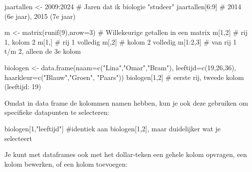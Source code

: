 \documentclass[
  b5paper,
  DIV=11,
  numbers=noendperiod]{scrreprt}
\newenvironment{Shaded}{\begin{snugshade}}{\end{snugshade}}
\newcommand{\AttributeTok}[1]{\textcolor[rgb]{0.40,0.45,0.13}{#1}}
\newcommand{\CommentTok}[1]{\textcolor[rgb]{0.37,0.37,0.37}{#1}}
\newcommand{\DecValTok}[1]{\textcolor[rgb]{0.68,0.00,0.00}{#1}}
\newcommand{\FunctionTok}[1]{\textcolor[rgb]{0.28,0.35,0.67}{#1}}
\newcommand{\NormalTok}[1]{\textcolor[rgb]{0.00,0.23,0.31}{#1}}
\newcommand{\OtherTok}[1]{\textcolor[rgb]{0.00,0.23,0.31}{#1}}
\newcommand{\SpecialCharTok}[1]{\textcolor[rgb]{0.37,0.37,0.37}{#1}}
\newcommand{\StringTok}[1]{\textcolor[rgb]{0.13,0.47,0.30}{#1}}
\theoremstyle{definition}
\theoremstyle{remark}
\begin{document}
\begin{Shaded}
\begin{Highlighting}[]
\NormalTok{jaartallen }\OtherTok{\textless{}{-}} \DecValTok{2009}\SpecialCharTok{:}\DecValTok{2024}         \CommentTok{\# Jaren dat ik biologie "studeer"}
\NormalTok{jaartallen[}\DecValTok{6}\SpecialCharTok{:}\DecValTok{9}\NormalTok{]                 }\CommentTok{\# 2014 (6e jaar), 2015 (7e jaar)}

\NormalTok{m }\OtherTok{\textless{}{-}} \FunctionTok{matrix}\NormalTok{(}\FunctionTok{runif}\NormalTok{(}\DecValTok{9}\NormalTok{),}\AttributeTok{nrow=}\DecValTok{3}\NormalTok{)    }\CommentTok{\# Willekeurige getallen in een matrix}
\NormalTok{m[}\DecValTok{1}\NormalTok{,}\DecValTok{2}\NormalTok{]    }\CommentTok{\# rij 1, kolom 2}
\NormalTok{m[}\DecValTok{1}\NormalTok{,]     }\CommentTok{\# rij 1 volledig}
\NormalTok{m[,}\DecValTok{2}\NormalTok{]     }\CommentTok{\# kolom 2 volledig}
\NormalTok{m[}\DecValTok{1}\SpecialCharTok{:}\DecValTok{2}\NormalTok{,}\DecValTok{3}\NormalTok{]  }\CommentTok{\# van rij 1 t/m 2, alleen de 3e kolom}

\NormalTok{biologen }\OtherTok{\textless{}{-}} \FunctionTok{data.frame}\NormalTok{(}\AttributeTok{naam=}\FunctionTok{c}\NormalTok{(}\StringTok{"Lina"}\NormalTok{,}\StringTok{"Omar"}\NormalTok{,}\StringTok{"Bram"}\NormalTok{),}
                       \AttributeTok{leeftijd=}\FunctionTok{c}\NormalTok{(}\DecValTok{19}\NormalTok{,}\DecValTok{26}\NormalTok{,}\DecValTok{36}\NormalTok{), }
                       \AttributeTok{haarkleur=}\FunctionTok{c}\NormalTok{(}\StringTok{"Blauw"}\NormalTok{,}\StringTok{"Groen"}\NormalTok{, }\StringTok{"Paars"}\NormalTok{))}
\NormalTok{biologen[}\DecValTok{1}\NormalTok{,}\DecValTok{2}\NormalTok{] }\CommentTok{\# eerste rij, tweede kolom (leeftijd: 19)}
\end{Highlighting}
\end{Shaded}

Omdat in data frame de kolommen namen hebben, kun je ook deze gebruiken
om specifieke datapunten te selecteren:

\begin{Shaded}
\begin{Highlighting}[]
\NormalTok{biologen[}\DecValTok{1}\NormalTok{,}\StringTok{"leeftijd"}\NormalTok{] }\CommentTok{\#identiek aan biologen[1,2], maar duidelijker wat je selecteert}
\end{Highlighting}
\end{Shaded}

Je kunt met dataframes ook met het dollar-teken een gehele kolom
opvragen, een kolom bewerken, of een kolom toevoegen:
\end{document}
